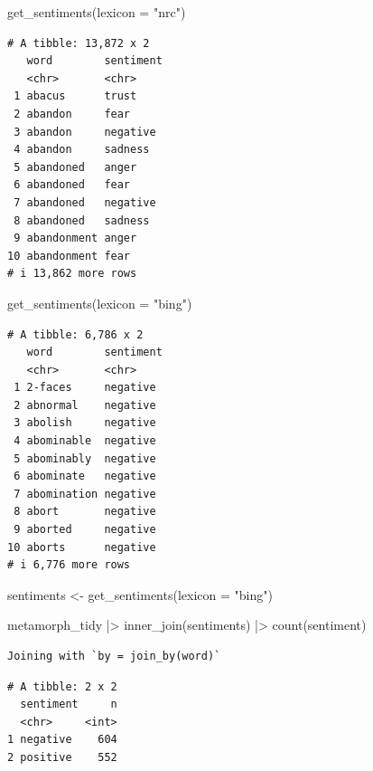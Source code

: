 \documentclass[
  letterpaper,
  DIV=11,
  numbers=noendperiod]{scrartcl}
\newenvironment{Shaded}{\begin{snugshade}}{\end{snugshade}}
\newcommand{\AttributeTok}[1]{\textcolor[rgb]{0.40,0.45,0.13}{#1}}
\newcommand{\FunctionTok}[1]{\textcolor[rgb]{0.28,0.35,0.67}{#1}}
\newcommand{\NormalTok}[1]{\textcolor[rgb]{0.00,0.23,0.31}{#1}}
\newcommand{\OtherTok}[1]{\textcolor[rgb]{0.00,0.23,0.31}{#1}}
\newcommand{\SpecialCharTok}[1]{\textcolor[rgb]{0.37,0.37,0.37}{#1}}
\newcommand{\StringTok}[1]{\textcolor[rgb]{0.13,0.47,0.30}{#1}}
\begin{document}
\begin{Shaded}
\begin{Highlighting}[]
\FunctionTok{get\_sentiments}\NormalTok{(}\AttributeTok{lexicon =} \StringTok{"nrc"}\NormalTok{)}
\end{Highlighting}
\end{Shaded}

\begin{verbatim}
# A tibble: 13,872 x 2
   word        sentiment
   <chr>       <chr>    
 1 abacus      trust    
 2 abandon     fear     
 3 abandon     negative 
 4 abandon     sadness  
 5 abandoned   anger    
 6 abandoned   fear     
 7 abandoned   negative 
 8 abandoned   sadness  
 9 abandonment anger    
10 abandonment fear     
# i 13,862 more rows
\end{verbatim}

\begin{Shaded}
\begin{Highlighting}[]
\FunctionTok{get\_sentiments}\NormalTok{(}\AttributeTok{lexicon =} \StringTok{"bing"}\NormalTok{)}
\end{Highlighting}
\end{Shaded}

\begin{verbatim}
# A tibble: 6,786 x 2
   word        sentiment
   <chr>       <chr>    
 1 2-faces     negative 
 2 abnormal    negative 
 3 abolish     negative 
 4 abominable  negative 
 5 abominably  negative 
 6 abominate   negative 
 7 abomination negative 
 8 abort       negative 
 9 aborted     negative 
10 aborts      negative 
# i 6,776 more rows
\end{verbatim}

\begin{Shaded}
\begin{Highlighting}[]
\NormalTok{sentiments }\OtherTok{\textless{}{-}} \FunctionTok{get\_sentiments}\NormalTok{(}\AttributeTok{lexicon =} \StringTok{"bing"}\NormalTok{)}


\NormalTok{metamorph\_tidy }\SpecialCharTok{|\textgreater{}}   
  \FunctionTok{inner\_join}\NormalTok{(sentiments) }\SpecialCharTok{|\textgreater{}}
  \FunctionTok{count}\NormalTok{(sentiment)}
\end{Highlighting}
\end{Shaded}

\begin{verbatim}
Joining with `by = join_by(word)`
\end{verbatim}

\begin{verbatim}
# A tibble: 2 x 2
  sentiment     n
  <chr>     <int>
1 negative    604
2 positive    552
\end{verbatim}
\end{document}
